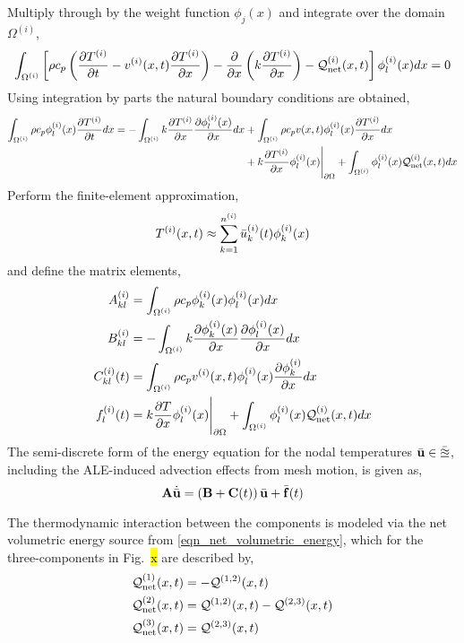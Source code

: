 Multiply through by the weight function $\phi_j(x)$ and integrate over the domain $\Omega^{(i)}$,
\begin{equation}
    \int_{\Omega^{(i)}}\left[\rho c_p\left(\frac{\partial T^{(i)}}{\partial t} - v^{(i)}(x,t)\frac{\partial T^{(i)}}{\partial x}\right) - \frac{\partial}{\partial x}\left(k\frac{\partial T^{(i)}}{\partial x}\right) - \mathcal{Q}^{(i)}_{\text{net}}(x,t)\right]\phi^{(i)}_l(x)dx = 0
\end{equation}
Using integration by parts the natural boundary conditions are obtained,
\begin{align}
    \int_{\Omega^{(i)}}\rho c_p\phi^{(i)}_l(x)\frac{\partial T^{(i)}}{\partial t}dx = -\int_{\Omega^{(i)}}k\frac{\partial T^{(i)}}{\partial x}\frac{\partial\phi^{(i)}_l(x)}{\partial x} dx &+ \int_{\Omega^{(i)}}\rho c_p v(x,t)\phi^{(i)}_l(x)\frac{\partial T^{(i)}}{\partial x} dx \notag\\
    & + k\frac{\partial T^{(i)}}{\partial x}\phi^{(i)}_l(x)\Bigg|_{\partial\Omega} + \int_{\Omega^{(i)}}\phi^{(i)}_l(x)\mathcal{Q}_{\text{net}}^{(i)}(x,t)dx
\end{align}
Perform the finite-element approximation,
\begin{equation}
    T^{(i)}(x,t)\approx\sum_{k=1}^{n^{(i)}}\bar{u}^{(i)}_k(t)\phi^{(i)}_k(x)
\end{equation}
and define the matrix elements,
\begin{align}
    A^{(i)}_{kl} &= \int_{\Omega^{(i)}}\rho c_p\phi^{(i)}_k(x)\phi^{(i)}_l(x)dx\\
    B^{(i)}_{kl} &= -\int_{\Omega^{(i)}}k\frac{\partial\phi^{(i)}_k(x)}{\partial x}\frac{\partial\phi^{(i)}_l(x)}{\partial x}dx\\
    C^{(i)}_{kl}(t) &= \int_{\Omega^{(i)}}\rho c_p v^{(i)}(x,t)\phi^{(i)}_l(x)\frac{\partial\phi^{(i)}_k}{\partial x}dx\\
    f^{(i)}_l(t) &= k\frac{\partial T}{\partial x}\phi^{(i)}_l(x)\Bigg|_{\partial\Omega} + \int_{\Omega^{(i)}}\phi^{(i)}_l(x)\mathcal{Q}_{\text{net}}^{(i)}(x,t)dx
\end{align}
The semi-discrete form of the energy equation for the nodal temperatures $\bar{\mathbf{u}}\in\mathbb{\bar{u}}$, including the ALE-induced advection effects from mesh motion, is given as,
\begin{equation}
    \mathbf{A}\dot{\bar{\mathbf{u}}} = \left(\mathbf{B} + \mathbf{C}(t)\right)\bar{\mathbf{u}} + \bar{\mathbf{f}}(t)
\end{equation}




The thermodynamic interaction between the components is modeled via the net volumetric energy source from \cref{eqn_net_volumetric_energy}, which for the three-components in Fig.~\hl{x} are described by,
\begin{subequations}
    \begin{align}
        \mathcal{Q}^{(1)}_{\text{net}}(x,t) &= -\mathcal{Q}^{(1,2)}(x,t)\\
        \mathcal{Q}^{(2)}_{\text{net}}(x,t) &= \mathcal{Q}^{(1,2)}(x,t) - \mathcal{Q}^{(2,3)}(x,t)\\
        \mathcal{Q}^{(3)}_{\text{net}}(x,t) &= \mathcal{Q}^{(2,3)}(x,t)
    \end{align}
\end{subequations}


